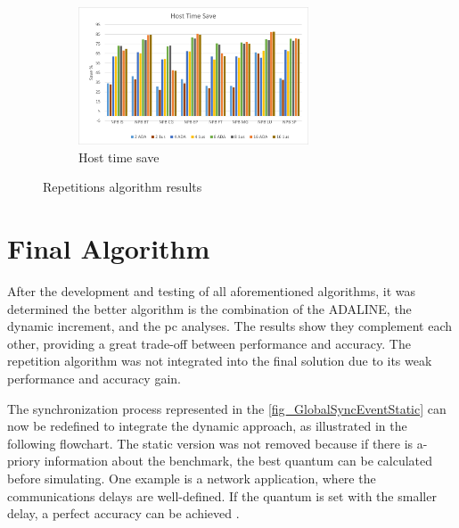 \begin{figure}[H]
\begin{subfigure}{\textwidth}
    \centering
    \includegraphics[width=0.75\textwidth]{Images/Host_ADA.png}
    \caption{ Host time save}
    \label{fig:Host_ADAINCPCREP}
\end{subfigure}
        
\caption{Repetitions algorithm results}
\label{fig:results_ADAINCPCREP}
\end{figure}






\section{Final Algorithm}

After the development and testing of all aforementioned algorithms, it was determined the better algorithm is the combination of the ADALINE, the dynamic increment, and the \gls{pc} analyses. The results show they complement each other, providing a great trade-off between performance and accuracy. The repetition algorithm was not integrated into the final solution due to its weak performance and accuracy gain. 

The synchronization process represented in the \autoref{fig_GlobalSyncEventStatic} can now be redefined to integrate the dynamic approach, as illustrated in the following flowchart. The static version was not removed because if there is a-priory information about the benchmark, the best quantum can be calculated before simulating. One example is a network application, where the communications delays are well-defined. If the quantum is set with the smaller delay, a perfect accuracy can be achieved \cite{dist-gem5}. 

